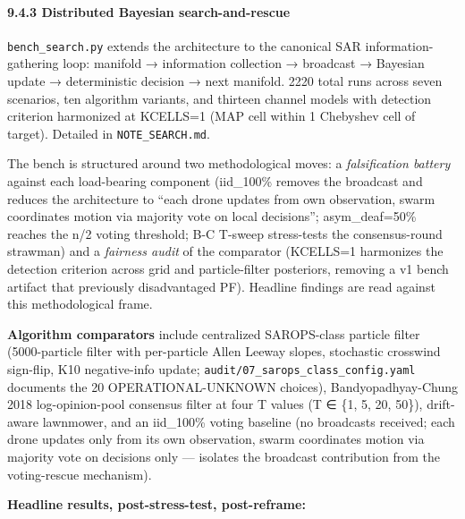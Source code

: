 \paragraph{9.4.3 Distributed Bayesian
search-and-rescue}\label{distributed-bayesian-search-and-rescue}

\texttt{bench\_search.py} extends the architecture to the canonical SAR
information-gathering loop: manifold → information collection →
broadcast → Bayesian update → deterministic decision → next manifold.
2220 total runs across seven scenarios, ten algorithm variants, and
thirteen channel models with detection criterion harmonized at KCELLS=1
(MAP cell within 1 Chebyshev cell of target). Detailed in
\texttt{NOTE\_SEARCH.md}.

The bench is structured around two methodological moves: a
\emph{falsification battery} against each load-bearing component
(iid\_100\% removes the broadcast and reduces the architecture to ``each
drone updates from own observation, swarm coordinates motion via
majority vote on local decisions''; asym\_deaf=50\% reaches the n/2
voting threshold; B-C T-sweep stress-tests the consensus-round strawman)
and a \emph{fairness audit} of the comparator (KCELLS=1 harmonizes the
detection criterion across grid and particle-filter posteriors, removing
a v1 bench artifact that previously disadvantaged PF). Headline findings
are read against this methodological frame.

\textbf{Algorithm comparators} include centralized SAROPS-class particle
filter (5000-particle filter with per-particle Allen Leeway slopes,
stochastic crosswind sign-flip, K10 negative-info update;
\texttt{audit/07\_sarops\_class\_config.yaml} documents the 20
OPERATIONAL-UNKNOWN choices), Bandyopadhyay-Chung 2018 log-opinion-pool
consensus filter at four T values (T ∈ \{1, 5, 20, 50\}), drift-aware
lawnmower, and an iid\_100\% voting baseline (no broadcasts received;
each drone updates only from its own observation, swarm coordinates
motion via majority vote on decisions only --- isolates the broadcast
contribution from the voting-rescue mechanism).

\textbf{Headline results, post-stress-test, post-reframe:}

